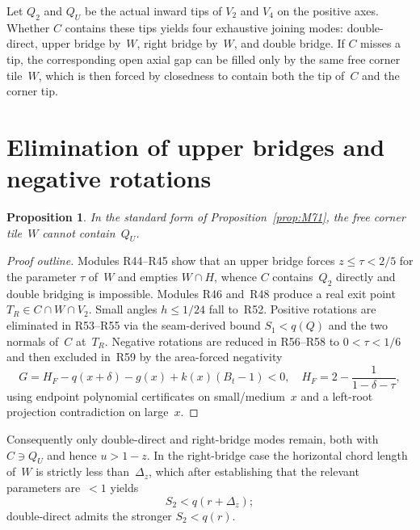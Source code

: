 \documentclass[11pt,reqno]{amsart}
\newtheorem{proposition}[theorem]{Proposition}
\theoremstyle{definition}
\begin{document}
Let $Q_2$ and $Q_U$ be the actual inward tips of $V_2$ and $V_4$ on the positive
axes.  Whether $C$ contains these tips yields four exhaustive joining modes:
double-direct, upper bridge by~$W$, right bridge by~$W$, and double bridge.
If $C$ misses a tip, the corresponding open axial gap can be filled only by the
same free corner tile~$W$, which is then forced by closedness to contain both
the tip of~$C$ and the corner tip.

\section{Elimination of upper bridges and negative rotations}\label{sec:M9}

\begin{proposition}\label{prop:M91}
In the standard form of Proposition~\ref{prop:M71}, the free corner tile~$W$
cannot contain~$Q_U$.
\end{proposition}

\begin{proof}[Proof outline]
Modules R44--R45 show that an upper bridge forces $z\le\tau<2/5$ for the
parameter $\tau$ of~$W$ and empties $W\cap H$, whence $C$ contains~$Q_2$
directly and double bridging is impossible.  Modules R46 and~R48 produce a
real exit point $T_R\in C\cap W\cap V_2$.  Small angles $h\le 1/24$ fall to~R52.
Positive rotations are eliminated in R53--R55 via the seam-derived bound
$S_1<q(Q)$ and the two normals of~$C$ at~$T_R$.  Negative rotations are reduced
in R56--R58 to $0<\tau<1/6$ and then excluded in~R59 by the area-forced
negativity
\begin{equation}\label{eq:M12}
G=H_F-q(x+\delta)-g(x)+k(x)(B_t-1)<0,
\quad H_F=2-\frac1{1-\delta-\tau},
\end{equation}
using endpoint polynomial certificates on small/medium~$x$ and a left-root
projection contradiction on large~$x$.
\end{proof}

Consequently only double-direct and right-bridge modes remain, both with
$C\ni Q_U$ and hence $u>1-z$.  In the right-bridge case the horizontal chord
length of~$W$ is strictly less than~$\Delta_z$, which after establishing that
the relevant parameters are~$<1$ yields
\begin{equation}\label{eq:M13}
S_2<q(r+\Delta_z);
\end{equation}
double-direct admits the stronger $S_2<q(r)$.
\end{document}
